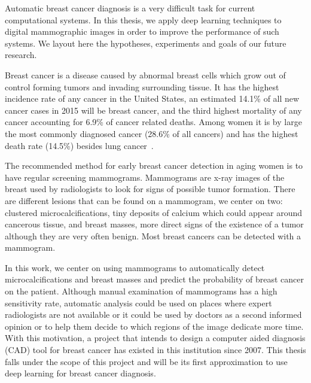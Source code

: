\begin{comment} 
Hook(first paragarpah) : Automatic breast cancer diagnosis is a very difficult taks for current automatic computationnal systems. In this article,  we apply deep learning techniques to digital mammogrpahic images and obtain better results than presented to date. We show or prove or use this technique to obtain this... (when we have results)
\end{comment}
Automatic breast cancer diagnosis is a very difficult task for current computational systems. In this thesis, we apply deep learning techniques to digital mammographic images in order to improve the performance of such systems. We layout here the hypotheses, experiments and goals of our future research.

Breast cancer is a disease caused by abnormal breast cells which grow out of control forming tumors and invading surrounding tissue.
It has the highest incidence rate of any cancer in the United States, an estimated 14.1\% of all new cancer cases in 2015 will be breast cancer, and the third highest mortality of any cancer accounting for 6.9\% of cancer related deaths. Among women it is by large the most commonly diagnosed cancer (28.6\% of all cancers) and has the highest death rate (14.5\%) besides lung cancer~\cite{ACS2015}.

The recommended method for early breast cancer detection in aging women is to have regular screening mammograms. Mammograms are x-ray images of the breast used by radiologists to look for signs of possible tumor formation. There are different lesions that can be found on a mammogram, we center on two: clustered microcalcifications, tiny deposits of calcium which could appear around cancerous tissue, and breast masses, more direct signs of the existence of a tumor although they are very often benign. Most breast cancers can be detected with a mammogram.%

In this work, we center on using mammograms to automatically detect microcalcifications and breast masses and predict the probability of breast cancer on the patient. Although manual examination of mammograms has a high sensitivity rate, automatic analysis could be used on places where expert radiologists are not available or it could be used by doctors as a second informed opinion or to help them decide to which regions of the image dedicate more time. With this motivation, a project that intends to design a computer aided diagnosis (CAD) tool for breast cancer has existed in this institution since 2007. This thesis falls under the scope of this project and will be its first approximation to use deep learning for breast cancer diagnosis.

